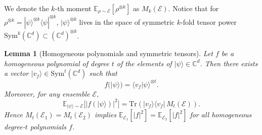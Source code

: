\documentclass[aps,prx,reprint,superscriptaddress,amsmath,amssymb,longbibliography,floatfix]{revtex4-2}
\providecommand{\bra}[1]{\langle #1|}
\providecommand{\ket}[1]{|#1 \rangle}
\providecommand{\braket}[2]{\langle #1|#2 \rangle}
\newcommand{\dsC}{\mathbb{C}}
\newcommand{\dsE}{\mathbb{E}}
\newcommand{\scE}{\mathcal{E}}
\theoremstyle{plain}
\newtheorem{lemma}[theorem]{Lemma}
\theoremstyle{definition}
\theoremstyle{remark}
\begin{document}
We denote the $k$-th moment $\dsE_{\rho\sim\scE}[\rho^{\otimes k}]$ as $M_k(\scE)$. Notice that for $\rho^{\otimes k} = \ket{\psi}^{\otimes k} \bra{\psi}^{\otimes k}$, $\ket{\psi}^{\otimes k}$ lives in the space of symmetric $k$-fold tensor power $\mathrm{Sym}^k(\dsC^d) \subset (\dsC^d) ^{\otimes k}$.

\begin{lemma}[Homogeneous polynomials and symmetric tensors]
Let $f$ be a homogeneous polynomial of degree $t$ of the elements of $\ket{\psi}\in\mathbb C^d$.
Then there exists a vector $\lvert v_f\rangle \in \mathrm{Sym}^t(\mathbb C^d)$ such that
\begin{equation}
f(\ket{\psi}) = \braket{v_f}{\psi}^{\otimes t}.
\label{eq:app-polynomial-tensor-representation}
\end{equation}
Moreover, for any ensemble $\mathcal E$,
\begin{equation}
\dsE_{\ket{\psi}\sim\mathcal E}\bigl[\lvert f(\ket{\psi})\rvert^2\bigr]
=
\mathrm{Tr}\!\left( \lvert v_f\rangle\langle v_f\rvert \, M_t(\mathcal E)\right).
\label{eq:app-polynomial-moment-identity}
\end{equation}
Hence $M_t(\mathcal E_1)=M_t(\mathcal E_2)$ implies
$\dsE_{\mathcal E_1}[\lvert f\rvert^2]=\dsE_{\mathcal E_2}[\lvert f\rvert^2]$
for all homogeneous degree-$t$ polynomials $f$. \label{lemma: homogeneous and sym}
\end{lemma}
\end{document}
